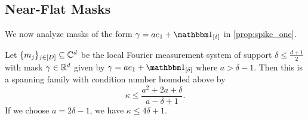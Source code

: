 \subsection{Near-Flat Masks}
\label{sec:nearflat_mask}
We now analyze masks of the form $\gamma = a e_1 + \one_{[\delta]}$ in \cref{prop:spike_one}.

\begin{proposition}
  Let $\{m_j\}_{j \in [D]} \subseteq \mathbb{C}^d$ be the local Fourier measurement system of support $\delta \le \frac{d + 1}{2}$ with mask $\gamma \in \mathbb{R}^d$ given by $\gamma = a e_1 + \one_{[\delta]}$ where $a > \delta - 1$.  Then this is a spanning family with condition number bounded above by \begin{equation} \kappa \le \dfrac{a^2 + 2 a + \delta}{a - \delta + 1}. \label{eq:spike_cond} \end{equation}  If we choose $a = 2 \delta - 1$, we have $\kappa \le 4 \delta + 1$.
  \label{prop:spike_one}
\end{proposition}

